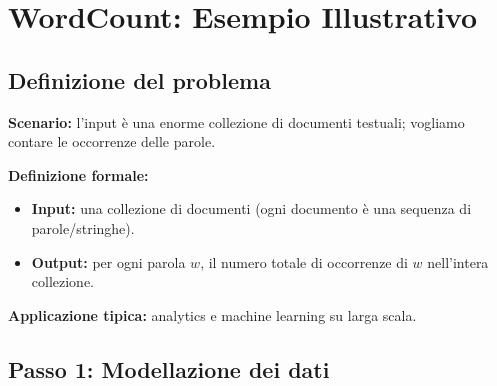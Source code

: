 \newpage
\section{WordCount: Esempio Illustrativo}

\subsection{Definizione del problema}

\begin{esempio}
  \textbf{Scenario:} l'input è una enorme collezione di documenti testuali;
  vogliamo contare le occorrenze delle parole.

  \textbf{Definizione formale:}
  \begin{itemize}
    \item \textbf{Input:} una collezione di documenti (ogni documento è una
      sequenza di parole/stringhe).
    \item \textbf{Output:} per ogni parola $w$, il numero totale di occorrenze
      di $w$ nell'intera collezione.
  \end{itemize}

  \textbf{Applicazione tipica:} analytics e machine learning su larga scala.
\end{esempio}

\subsection{Passo 1: Modellazione dei dati}

